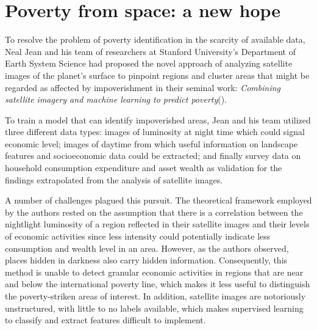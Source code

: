 \documentclass[solid,math,chem,code,plot,gloss]{bmc}
\begin{document}
\section{Poverty from space: a new hope}

To resolve the problem of poverty identification in the scarcity of available data, Neal Jean and his team of researchers at Stanford University’s Department of Earth System Science had proposed the novel approach of analyzing satellite images of the planet’s surface to pinpoint regions and cluster areas that might be regarded as affected by impoverishment in their seminal work: \textit{Combining satellite imagery and machine learning to predict poverty}(\cite{Neal_2016}). 

To train a model that can identify impoverished areas, Jean and his team utilized three different data types: images of luminosity at night time which could signal economic level; images of daytime from which useful information on landscape features and socioeconomic data could be extracted; and finally survey data on household consumption expenditure and asset wealth as validation for the findings extrapolated from the analysis of satellite images. 

A number of challenges plagued this pursuit. The theoretical framework employed by the authors rested on the assumption that there is a correlation between the nightlight luminosity of a region reflected in their satellite images and their levels of economic activities since less intensity could potentially indicate less consumption and wealth level in an area. However, as the authors observed, places hidden in darkness also carry hidden information. Consequently, this method is unable to detect granular economic activities in regions that are near and below the international poverty line, which makes it less useful to distinguish the poverty-striken areas of interest. In addition, satellite images are notoriously unstructured, with little to no labels available, which makes supervised learning to classify and extract features difficult to implement.  
\end{document}
